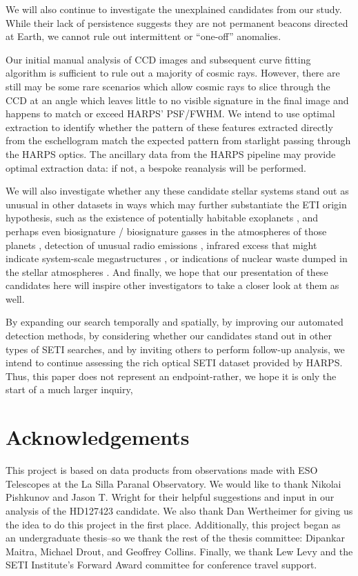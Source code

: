 \documentclass[linenumbers]{aastex631}
\begin{document}
We will also continue to investigate the unexplained candidates from our study.  While their lack of persistence suggests they are not permanent beacons directed at Earth, we cannot rule out intermittent or ``one-off'' anomalies. 

Our initial manual analysis of CCD images and subsequent curve fitting algorithm is sufficient to rule out a majority of cosmic rays. However, there are still may be some rare scenarios which allow cosmic rays to slice through the CCD at an angle which leaves little to no visible signature in the final image and happens to match or exceed HARPS' PSF/FWHM. We intend to use optimal extraction \citep{horne86optimal_extraction} to identify whether the pattern of these features extracted directly from the eschellogram  match the expected pattern from starlight passing through the HARPS optics. The ancillary data from the HARPS pipeline \citep{HARPS_specs} may provide optimal extraction data: if not, a bespoke reanalysis will be performed. 

We will also investigate whether any these candidate stellar systems stand out as unusual in other datasets in ways which may further substantiate the ETI origin hypothesis, such as the existence of potentially habitable exoplanets \citep{exoplanets}, and perhaps even biosignature / biosignature gasses in the atmospheres of those planets \citep{exoplanetbiosignatures,HAQQMISRA2022194}, detection of unusual radio emissions \citep{BACKUS1998651}, infrared excess that might indicate system-scale megastructures \citep{dysonspheres,TILGNER1998607}, or indications of nuclear waste dumped in the stellar atmospheres \citep{WHITMIRE1980149}. And finally, we hope that our presentation of these candidates here will inspire other investigators to take a closer look at them as well.

By expanding our search temporally and spatially, by improving our automated detection methods, by considering whether our candidates stand out in other types of SETI searches, and by inviting others to perform follow-up analysis, we intend to continue assessing the rich optical SETI dataset provided by HARPS. Thus, this paper does not represent an endpoint-rather, we hope it is only the start of a much larger inquiry,


\section{Acknowledgements}
This project is based on data products from observations made with ESO Telescopes at the La Silla Paranal Observatory. We would like to thank Nikolai Pishkunov and Jason T. Wright for their helpful suggestions and input in our analysis of the HD127423 candidate. We also thank Dan Wertheimer for giving us the idea to do this project in the first place. Additionally, this project began as an undergraduate thesis--so we thank the rest of the thesis committee: Dipankar Maitra, Michael Drout, and Geoffrey Collins. Finally, we thank Lew Levy and the SETI Institute's Forward Award committee for conference travel support.
\end{document}
